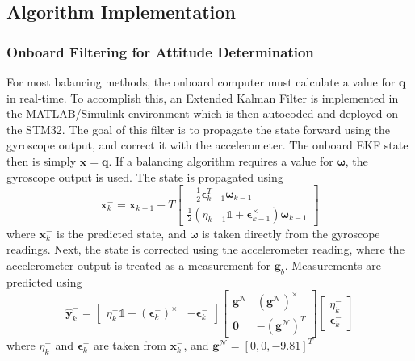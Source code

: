\subsection{Algorithm Implementation}

\subsubsection{Onboard Filtering for Attitude Determination}

For most balancing methods, the onboard computer must calculate a value for $\bm{q}$ in real-time. To accomplish this, an Extended Kalman Filter is implemented in the MATLAB/Simulink environment which is then autocoded and deployed on the STM32. The goal of this filter is to propagate the state forward using the gyroscope output, and correct it with the accelerometer. The onboard EKF state then is simply $\bm{x} = \bm{q}$. If a balancing algorithm requires a value for $\bm{\omega}$, the gyroscope output is used. The state is propagated using
\begin{equation}\label{equation:EKF_process}
    \bm{x}_k^-=\bm{x}_{k-1} + T\begin{bmatrix}
    
    -\frac{1}{2}\bm{\epsilon}_{k-1}^T\bm{\omega}_{k-1} \\
    \frac{1}{2}(\eta_{k-1}\mathbb{1} +
    \bm{\epsilon}_{k-1}^{\times})\bm{\omega}_{k-1}
\end{bmatrix}
\end{equation}
where $\bm{x}_k^-$ is the predicted state, and $\bm{\omega}$ is taken directly from the gyroscope readings. Next, the state is corrected using the accelerometer reading, where the accelerometer output is treated as a measurement for $\bm{g}_b$. Measurements are predicted using 
\begin{equation}\label{equation:EKF_meas}
    \hat{\bm{y}}_k^-=
    \begin{bmatrix}    
    \eta_k^-\mathbb{1}-(\bm{\epsilon}_k^-)^{\times} & -\bm{\epsilon}_k^-
    \end{bmatrix}
    \begin{bmatrix}    
    \bm{g}^\mathcal{N} & (\bm{g}^\mathcal{N})^{\times} \\
    \bm{0} & - (\bm{g}^\mathcal{N})^T
    \end{bmatrix}
    \begin{bmatrix}    
    \eta_k^- \\
    \bm{\epsilon}_k^-
    \end{bmatrix}
\end{equation}
where $\eta_k^-$ and $\bm{\epsilon}_k^-$ are taken from $\bm{x}_k^-$, and $\bm{g}^\mathcal{N}=[0, 0,-9.81]^T$

